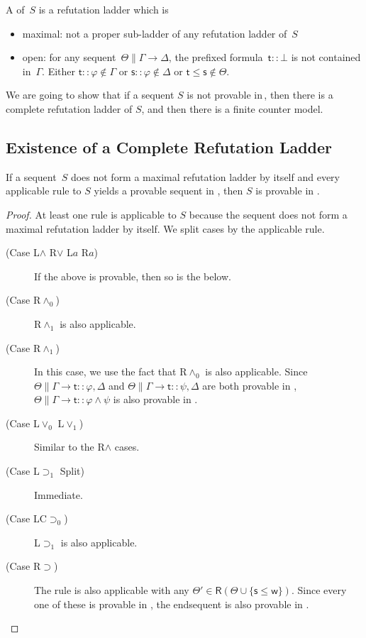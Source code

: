   \begin{definition}
   A  of~$S$ is a refutation ladder which is
   \begin{itemize}
    \item maximal: not a proper sub-ladder of any
	  refutation ladder of~$S$
    \item open:
	  for any sequent~$\Theta\parallel \Gamma\longrightarrow \Delta$,
	  the prefixed formula~$\mathsf t::\bot$ is not contained in~$\Gamma$.
	  Either
	  $\mathsf t::\varphi\notin \Gamma$ or
	  $\mathsf s::\varphi\notin\Delta$ or $\mathsf t\le \mathsf s\notin
	  \Theta$.
   \end{itemize}
  \end{definition}

  We are going to show that
  if a sequent $S$ is not provable in\,\LB, then there is a complete
  refutation ladder of $S$, and then there is a finite counter model.

   \subsection{Existence of a Complete Refutation Ladder}

   \begin{lemma}\label{chooser}
    If a sequent~$S$ does not form a maximal refutation ladder by itself and
    every applicable rule to $S$ yields a provable
    sequent in \LB, then $S$ is provable in \LB.
   \end{lemma}
   \begin{proof}
    At least one rule is applicable to $S$ because the sequent does
    not form a maximal refutation ladder by itself. We split cases by the
    applicable rule.
    \begin{description}
     \item[ (Case L$\wedge$ R$\vee$ L$a$ R$a$)]
	  If the above is provable, then so is the below.
     \item[ (Case R$\wedge_0$)]
	  R$\wedge_1$ is also applicable.
     \item[ (Case R$\wedge_1$)]
	  In this case, we use the fact that R$\wedge_0$ is also
	  applicable.
	  Since $\Theta\parallel\Gamma\longrightarrow \mathsf t::\varphi, \Delta$ and
	  $\Theta\parallel\Gamma\longrightarrow \mathsf t::\psi,
	  \Delta$ are both provable in \LB,
	  $\Theta\parallel\Gamma\longrightarrow \mathsf
	  t::\varphi\land\psi$ is also provable in \LB.
     \item[ (Case L$\vee_0$ L$\vee_1$)]
	  Similar to the R$\wedge$ cases.
     \item[ (Case L$\supset_1$ Split)] Immediate.
     \item[ (Case LC$\supset_0$)]
	  L$\supset_1$ is also applicable.
     \item[ (Case R$\supset$)]
	  The rule is also applicable with any $\Theta'\in
	  \mathsf R(\Theta\cup\{\mathsf s\le \mathsf w\})$. Since every one of these is
	  provable in \LB,
	  the endsequent is also provable in \LB.
    \end{description}
   \end{proof}

